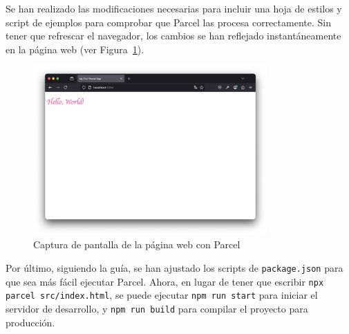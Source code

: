 \documentclass{article}
\begin{document}
Se han realizado las modificaciones necesarias para incluir una hoja de estilos y script de ejemplos para comprobar que Parcel las procesa correctamente.
Sin tener que refrescar el navegador, los cambios se han reflejado instantáneamente en la página web (ver Figura~\ref{fig:parcel}).

 \begin{figure}[h!]
     \centering
     \includegraphics[width=0.8\textwidth]{./img/hello-world-styled}
     \caption{Captura de pantalla de la página web con Parcel}
     \label{fig:parcel}
 \end{figure}

Por último, siguiendo la guía, se han ajustado los scripts de \lstinline|package.json| para que sea más fácil ejecutar Parcel.
Ahora, en lugar de tener que escribir \lstinline|npx parcel src/index.html|, se puede ejecutar \lstinline|npm run start| para iniciar el servidor de desarrollo, y \lstinline|npm run build| para compilar el proyecto para producción.
\end{document}
